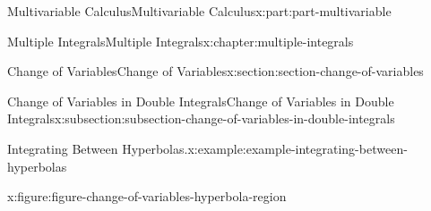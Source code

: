 \documentclass[twoside,10pt,]{tufte-book}
\numberwithin{equation}{part}
\begin{document}
\begin{partptx}{Multivariable Calculus}{}{Multivariable Calculus}{}{}{x:part:part-multivariable}
\begin{chapterptx}{Multiple Integrals}{}{Multiple Integrals}{}{}{x:chapter:multiple-integrals}
\begin{sectionptx}{Change of Variables}{}{Change of Variables}{}{}{x:section:section-change-of-variables}
\begin{subsectionptx}{Change of Variables in Double Integrals}{}{Change of Variables in Double Integrals}{}{}{x:subsection:subsection-change-of-variables-in-double-integrals}
\begin{example}{Integrating Between Hyperbolas.}{x:example:example-integrating-between-hyperbolas}
\begin{figureptx}{}{x:figure:figure-change-of-variables-hyperbola-region}{}
\begin{image}{0}{1}{0}%
\end{image}
\end{figureptx}
\end{example}
\end{subsectionptx}
\end{sectionptx}
\end{chapterptx}
\end{partptx}
\end{document}
